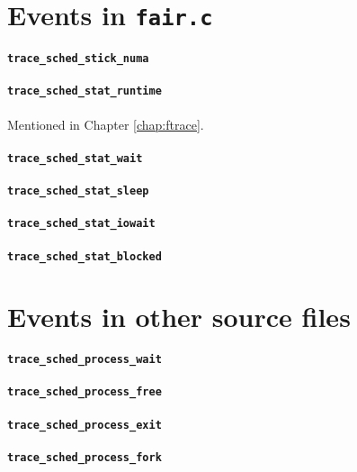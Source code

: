 \section{Events in \texttt{fair.c}}

\paragraph{\texttt{trace\_sched\_stick\_numa}}
\paragraph{\texttt{trace\_sched\_stat\_runtime}}
Mentioned in Chapter \ref{chap:ftrace}.
\paragraph{\texttt{trace\_sched\_stat\_wait}}
\paragraph{\texttt{trace\_sched\_stat\_sleep}}
\paragraph{\texttt{trace\_sched\_stat\_iowait}}
\paragraph{\texttt{trace\_sched\_stat\_blocked}}

\section{Events in other source files}

\paragraph{\texttt{trace\_sched\_process\_wait}}
\paragraph{\texttt{trace\_sched\_process\_free}}
\paragraph{\texttt{trace\_sched\_process\_exit}}
\paragraph{\texttt{trace\_sched\_process\_fork}}
